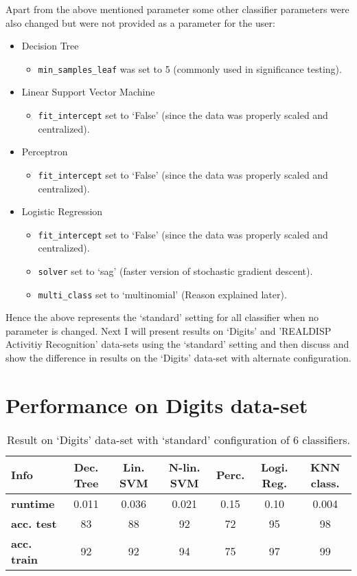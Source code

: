 \documentclass[12pt]{article}
\begin{document}
Apart from the above mentioned parameter some other classifier parameters were also changed but were not provided as a parameter for the user:

\begin{itemize}
\item Decision Tree
\begin{itemize}
\item \texttt{min\_samples\_leaf} was set to 5 (commonly used in significance testing).
\end{itemize}
\item Linear Support Vector Machine
\begin{itemize}
\item \texttt{fit\_intercept} set to `False' (since the data was properly scaled and centralized).
\end{itemize}
\item Perceptron
\begin{itemize}
\item \texttt{fit\_intercept} set to `False' (since the data was properly scaled and centralized).
\end{itemize}
\item Logistic Regression
\begin{itemize}
\item \texttt{fit\_intercept} set to `False' (since the data was properly scaled and centralized).
\item \texttt{solver} set to `sag' (faster version of stochastic gradient descent).
\item \texttt{multi\_class} set to `multinomial' (Reason explained later). 
\end{itemize}
\end{itemize}

Hence the above represents the `standard' setting for all classifier when no parameter is changed. Next I will present results on `Digits' and 'REALDISP Activitiy Recognition' data-sets using the `standard' setting and then discuss and show the difference in results on the `Digits' data-set with alternate configuration.

\section*{Performance on Digits data-set}

\begin{table}[!hptb]
\begin{tabular}{|l|c|c|c|c|c|c|}
\hline
\textbf{Info} & \textbf{Dec. Tree} & \textbf{Lin. SVM} & \textbf{N-lin. SVM} & \textbf{Perc.} & \textbf{Logi. Reg.} & \textbf{KNN class.} \\\hline
\textbf{runtime} & 0.011 & 0.036 &	0.021 &	0.15 & 0.10 & 0.004 \\
\textbf{acc. test} & 83 & 88 & 92 & 72 & 95 & 98 \\
\textbf{acc. train} & 92 & 92 & 94 & 75 & 97 & 99 \\\hline
\end{tabular}
\caption{Result on `Digits' data-set with `standard' configuration of 6 classifiers.}
\end{table}
\end{document}

